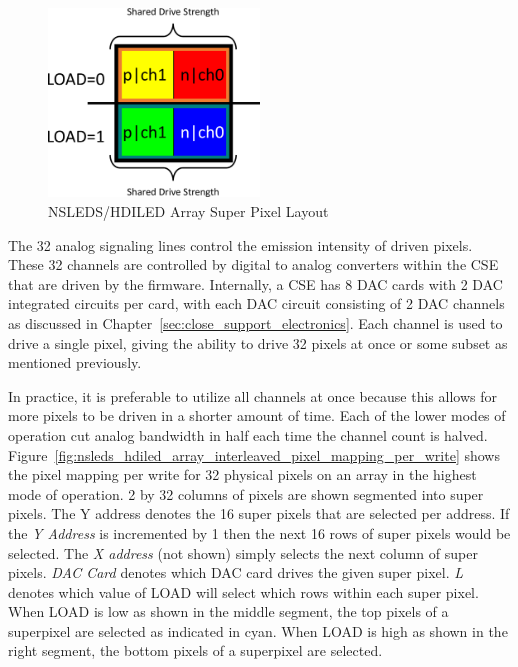     \begin{figure}
        \centering
        \includegraphics[width=0.50\textwidth]{fig/superpixel_layout.pdf}
        \caption{NSLEDS/HDILED Array Super Pixel Layout}
        \label{fig:nsleds_hdiled_array_superpixel_layout}
    \end{figure}

    The 32 analog signaling lines control the emission intensity of driven pixels. These 32 channels are controlled by digital to analog converters within the CSE that are driven by the firmware. Internally, a CSE has 8 DAC cards with 2 DAC integrated circuits per card, with each DAC circuit consisting of 2 DAC channels as discussed in Chapter~\ref{sec:close_support_electronics}. Each channel is used to drive a single pixel, giving the ability to drive 32 pixels at once or some subset as mentioned previously.

    In practice, it is preferable to utilize all channels at once because this allows for more pixels to be driven in a shorter amount of time. Each of the lower modes of operation cut analog bandwidth in half each time the channel count is halved. Figure~\ref{fig:nsleds_hdiled_array_interleaved_pixel_mapping_per_write} shows the pixel mapping per write for 32 physical pixels on an array in the highest mode of operation. 2 by 32 columns of pixels are shown segmented into super pixels. The Y address denotes the 16 super pixels that are selected per address. If the {\it Y Address} is incremented by 1 then the next 16 rows of super pixels would be selected. The {\it X address} (not shown) simply selects the next column of super pixels. {\it DAC Card} denotes which DAC card drives the given super pixel. {\it L} denotes which value of LOAD will select which rows within each super pixel. When LOAD is low as shown in the middle segment, the top pixels of a superpixel are selected as indicated in cyan. When LOAD is high as shown in the right segment, the bottom pixels of a superpixel are selected.


